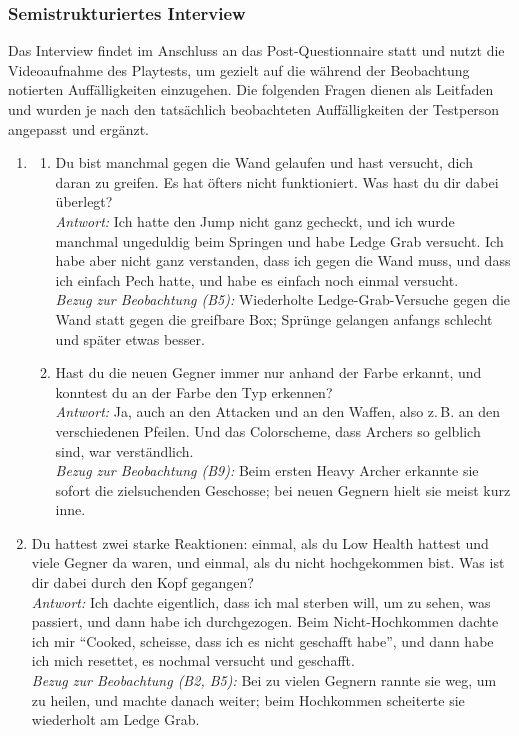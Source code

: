 \documentclass[../Main.tex]{subfiles}
\begin{document}
\subsubsection{Semistrukturiertes Interview}

Das Interview findet im Anschluss an das Post-Questionnaire statt und nutzt die Videoaufnahme des Playtests, um gezielt auf die während der Beobachtung notierten Auffälligkeiten einzugehen. Die folgenden Fragen dienen als Leitfaden und wurden je nach den tatsächlich beobachteten Auffälligkeiten der Testperson angepasst und ergänzt.

\begin{enumerate}[label=\textbf{I\arabic*}, leftmargin=1.5cm, itemsep=1em]
    \item
    \begin{enumerate}[label=\alph*), itemsep=0.6em]
        \item Du bist manchmal gegen die Wand gelaufen und hast versucht, dich daran zu greifen. Es hat öfters nicht funktioniert. Was hast du dir dabei überlegt? \\
        \textit{Antwort:} Ich hatte den Jump nicht ganz gecheckt, und ich wurde manchmal ungeduldig beim Springen und habe Ledge Grab versucht. Ich habe aber nicht ganz verstanden, dass ich gegen die Wand muss, und dass ich einfach Pech hatte, und habe es einfach noch einmal versucht. \\
        \textit{Bezug zur Beobachtung (B5):} Wiederholte Ledge-Grab-Versuche gegen die Wand statt gegen die greifbare Box; Sprünge gelangen anfangs schlecht und später etwas besser.
        \item Hast du die neuen Gegner immer nur anhand der Farbe erkannt, und konntest du an der Farbe den Typ erkennen? \\
        \textit{Antwort:} Ja, auch an den Attacken und an den Waffen, also z.\,B. an den verschiedenen Pfeilen. Und das Colorscheme, dass Archers so gelblich sind, war verständlich. \\
        \textit{Bezug zur Beobachtung (B9):} Beim ersten Heavy Archer erkannte sie sofort die zielsuchenden Geschosse; bei neuen Gegnern hielt sie meist kurz inne.
    \end{enumerate}

    \item Du hattest zwei starke Reaktionen: einmal, als du Low Health hattest und viele Gegner da waren, und einmal, als du nicht hochgekommen bist. Was ist dir dabei durch den Kopf gegangen? \\
    \textit{Antwort:} Ich dachte eigentlich, dass ich mal sterben will, um zu sehen, was passiert, und dann habe ich durchgezogen. Beim Nicht-Hochkommen dachte ich mir \enquote{Cooked, scheisse, dass ich es nicht geschafft habe}, und dann habe ich mich resettet, es nochmal versucht und geschafft. \\
    \textit{Bezug zur Beobachtung (B2, B5):} Bei zu vielen Gegnern rannte sie weg, um zu heilen, und machte danach weiter; beim Hochkommen scheiterte sie wiederholt am Ledge Grab.


\end{enumerate}
\end{document}
